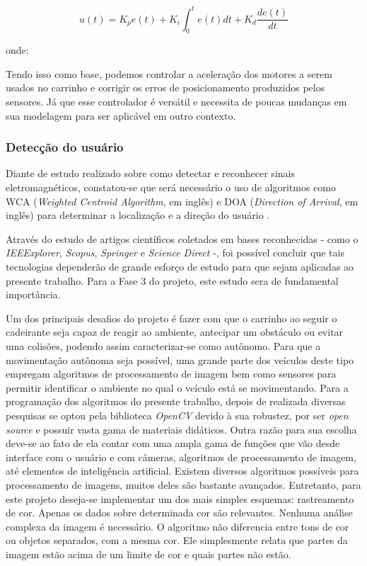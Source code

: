 $$
u(t)=K_p e(t)+K_i\int_0^t e(t) dt + K_d\frac{de(t)}{dt}
$$

onde:

Tendo isso como base, podemos controlar a aceleração dos motores a serem usados no carrinho e corrigir os erros de posicionamento produzidos pelos sensores. Já que esse controlador é versátil e necessita de poucas mudanças em sua modelagem para ser aplicável em outro contexto. \cite{wescott2000}

\subsubsection{Detecção do usuário}


\par Diante de estudo realizado sobre como detectar e reconhecer sinais eletromagnéticos, constatou-se que será necessário o uso de algoritmos como WCA (\textit{Weighted Centroid Algorithm}, em inglês) e DOA (\textit{Direction of Arrival}, em inglês) para determinar a localização e a direção do usuário \cite{min2015active}. 

Através do estudo de artigos científicos coletados em bases reconhecidas - como o \textit{IEEExplorer}, \textit{Scopus}, \textit{Springer} e \textit{Science Direct} -, foi possível concluir que tais tecnologias dependerão de grande esforço de estudo para que sejam aplicadas ao presente trabalho. Para a Fase 3 do projeto, este estudo sera de fundamental importância.


Um dos principais desafios do projeto é fazer com que o carrinho ao seguir o cadeirante seja capaz de reagir ao ambiente, antecipar um obstáculo ou evitar uma colisões, podendo assim caracterizar-se como autônomo.
Para que a movimentação autônoma seja possível, uma grande parte dos veículos deste tipo empregam algoritmos de processamento de imagem bem como sensores para permitir identificar o ambiente no qual o veículo está se movimentando. 
Para a programação dos algoritmos do presente trabalho, depois de realizada diversas pesquisas se optou pela biblioteca \textit{OpenCV} devido à sua robustez, por ser \textit{open source} e possuir vasta gama de materiais didáticos. Outra razão para sua escolha deve-se ao fato de ela contar com uma ampla gama de funções que vão desde interface com o usuário e com câmeras, algoritmos de processamento de imagem, até elementos de inteligência artificial. 
Existem diversos algoritmos possíveis para processamento de imagens, muitos deles são bastante avançados. Entretanto, para este projeto deseja-se implementar um dos mais simples esquemas: rastreamento de cor. Apenas os dados sobre determinada cor são relevantes. Nenhuma análise complexa da imagem é necessário. O algoritmo não diferencia entre tons de cor ou objetos separados, com a mesma cor. Ele simplesmente relata que partes da imagem estão acima de um limite de cor e quais partes não estão.
	
